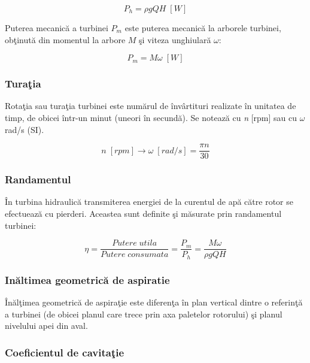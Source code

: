 \begin{equation}
P_h={\rho}gQH\; [\si{W}]
\end{equation}

Puterea mecanic\u{a} a turbinei $P_m$ este puterea mecanic\u{a} la arborele turbinei, ob\c{t}inut\u{a} din momentul la arbore $M$ \c{s}i viteza unghiular\u{a} $\omega$:

\begin{equation}
P_m=M{\omega}\; [\si{W}]
\end{equation}

\subsubsection{Tura\c{t}ia}

Rota\c{t}ia sau tura\c{t}ia turbinei este num\u{a}rul de \^{i}nv\^{a}rtituri realizate \^{i}n unitatea de timp, de obicei \^{i}ntr-un minut (uneori \^{i}n secund\u{a}). Se noteaz\u{a} cu \textit{n} [rpm] sau cu \(\omega\) rad/s (SI).

\begin{equation}
n\; [\si{rpm}]\rightarrow{\omega}\; [\si{rad/s}]=\frac{{\pi}n}{30}
\end{equation}


\subsubsection{Randamentul}

\^{I}n turbina hidraulic\u{a} transmiterea energiei de la curentul de ap\u{a} c\u{a}tre rotor se efectueaz\u{a} cu pierderi. Aceastea sunt definite \c{s}i m\u{a}surate prin randamentul turbinei:

\begin{equation}
{\eta}=\frac{Putere\; utila}{Putere\; consumata}=\frac{P_m}{P_h}=\frac{M{\omega}}{{\rho}gQH}
\end{equation}


\subsubsection{In\u{a}ltimea geometric\u{a} de aspiratie}

\^{I}n\u{a}l\c{t}imea geometric\u{a} de aspira\c{t}ie este diferen\c{t}a \^{i}n plan vertical dintre o referin\c{t}\u{a} a turbinei (de obicei planul care trece prin axa paletelor rotorului) \c{s}i planul nivelului apei din aval.

\subsubsection{Coeficientul de cavita\c{t}ie}

